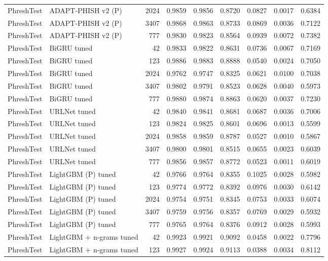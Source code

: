 \begin{table}[t]
\begin{tabular}{llrrrrrrr}
PhreshTest & ADAPT-PHISH v2 (P) & 2024 & 0.9859 & 0.9856 & 0.8720 & 0.0827 & 0.0017 & 0.6384 \\
PhreshTest & ADAPT-PHISH v2 (P) & 3407 & 0.9868 & 0.9863 & 0.8733 & 0.0869 & 0.0036 & 0.7122 \\
PhreshTest & ADAPT-PHISH v2 (P) & 777 & 0.9830 & 0.9823 & 0.8564 & 0.0939 & 0.0072 & 0.7382 \\
PhreshTest & BiGRU tuned & 42 & 0.9833 & 0.9822 & 0.8631 & 0.0736 & 0.0067 & 0.7169 \\
PhreshTest & BiGRU tuned & 123 & 0.9886 & 0.9883 & 0.8888 & 0.0540 & 0.0024 & 0.7050 \\
PhreshTest & BiGRU tuned & 2024 & 0.9762 & 0.9747 & 0.8325 & 0.0621 & 0.0100 & 0.7038 \\
PhreshTest & BiGRU tuned & 3407 & 0.9802 & 0.9791 & 0.8523 & 0.0628 & 0.0040 & 0.5973 \\
PhreshTest & BiGRU tuned & 777 & 0.9880 & 0.9874 & 0.8863 & 0.0620 & 0.0037 & 0.7230 \\
PhreshTest & URLNet tuned & 42 & 0.9840 & 0.9841 & 0.8681 & 0.0687 & 0.0036 & 0.7006 \\
PhreshTest & URLNet tuned & 123 & 0.9824 & 0.9825 & 0.8601 & 0.0696 & 0.0013 & 0.5599 \\
PhreshTest & URLNet tuned & 2024 & 0.9858 & 0.9859 & 0.8787 & 0.0527 & 0.0010 & 0.5867 \\
PhreshTest & URLNet tuned & 3407 & 0.9800 & 0.9801 & 0.8515 & 0.0655 & 0.0023 & 0.6039 \\
PhreshTest & URLNet tuned & 777 & 0.9856 & 0.9857 & 0.8772 & 0.0523 & 0.0011 & 0.6019 \\
PhreshTest & LightGBM (P) tuned & 42 & 0.9766 & 0.9764 & 0.8355 & 0.1025 & 0.0028 & 0.5982 \\
PhreshTest & LightGBM (P) tuned & 123 & 0.9774 & 0.9772 & 0.8392 & 0.0976 & 0.0030 & 0.6142 \\
PhreshTest & LightGBM (P) tuned & 2024 & 0.9754 & 0.9751 & 0.8345 & 0.0753 & 0.0033 & 0.6074 \\
PhreshTest & LightGBM (P) tuned & 3407 & 0.9759 & 0.9756 & 0.8357 & 0.0769 & 0.0029 & 0.5932 \\
PhreshTest & LightGBM (P) tuned & 777 & 0.9765 & 0.9764 & 0.8376 & 0.0912 & 0.0028 & 0.5993 \\
PhreshTest & LightGBM + n-grams tuned & 42 & 0.9923 & 0.9921 & 0.9092 & 0.0458 & 0.0022 & 0.7796 \\
PhreshTest & LightGBM + n-grams tuned & 123 & 0.9927 & 0.9924 & 0.9113 & 0.0388 & 0.0034 & 0.8112 \\

\end{tabular}
\end{table}
